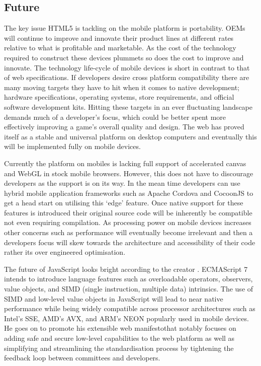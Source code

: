 \documentclass[final]{cmpreport}
\begin{document}
\subsection{Future}
The key issue HTML5 is tackling on the mobile platform is portability. OEMs will continue to improve and innovate their product lines at different rates relative to what is profitable and marketable. As the cost of the technology required to construct these devices plummets so does the cost to improve and innovate. The technology life-cycle of mobile devices is short in contrast to that of web specifications. If developers desire cross platform compatibility there are many moving targets they have to hit when it comes to native development; hardware specifications, operating systems, store requirements, and official software development kits. Hitting these targets in an ever fluctuating landscape demands much of a developer's focus, which could be better spent more effectively improving a game's overall quality and design. The web has proved itself as a stable and universal platform on desktop computers and eventually this will be implemented fully on mobile devices.

Currently the platform on mobiles is lacking full support of accelerated canvas and WebGL in stock mobile browsers. However, this does not have to discourage developers as the support is on its way. In the mean time developers can use hybrid mobile application frameworks such as Apache Cordova and CocoonJS to get a head start on utilising this `edge' feature. Once native support for these features is introduced their original source code will be inherently be compatible not even requiring compilation. As processing power on mobile devices increases other concerns such as performance will eventually become irrelevant and then a developers focus will skew towards the architecture and accessibility of their code rather its over engineered optimisation.

The future of JavaScript looks bright according to the creator \citet{Eich}. ECMAScript 7 intends to introduce language features such as overloadable operators, observers, value objects, and SIMD (single instruction, multiple data) intrinsics. The use of SIMD and low-level value objects in JavaScript will lead to near native performance while being widely compatible across processor architectures such as Intel's SSE, AMD's AVX, and ARM's NEON popularly used in mobile devices. He goes on to promote his extensible web manifesto\footnotemark that notably focuses on adding safe and secure low-level capabilities to the web platform as well as simplifying and streamlining the standardisation process by tightening the feedback loop between committees and developers.
\end{document}
